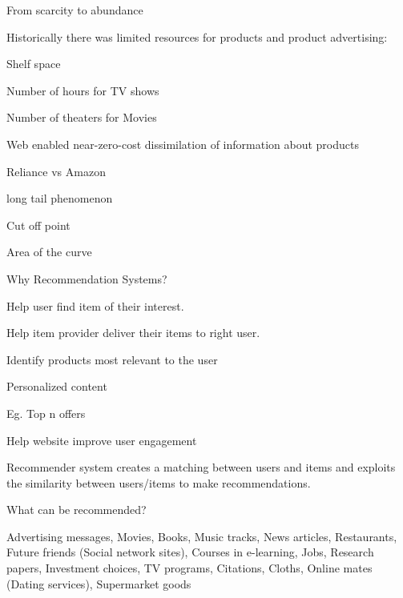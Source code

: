 \begin{bulletedlist}
		\item From scarcity to abundance
		\begin{bulletedlist}
			\item Historically there was limited resources for products and product advertising:
			\begin{bulletedlist}
				\item Shelf space
				\item Number of hours for TV shows
				\item Number of theaters for Movies
			\end{bulletedlist}
			\item Web enabled near-zero-cost dissimilation of information about products
			\begin{bulletedlist}
				\item Reliance vs Amazon
				\item long tail phenomenon
				\item Cut off point
				\item Area of the curve
			\end{bulletedlist}
		\end{bulletedlist}
		\item Why Recommendation Systems?
		\begin{bulletedlist}
			\item Help user find item of their interest.
			\item Help item provider deliver their items to right user.
			\begin{bulletedlist}
				\item Identify products most relevant to the user
				\item Personalized content
				\item Eg. Top n offers
			\end{bulletedlist}
			\item Help website improve user engagement
		\end{bulletedlist}
		\item Recommender system creates a matching between users and items and exploits the similarity between users/items to make recommendations.
		\item What can be recommended?
		\begin{bulletedlist}
			\item Advertising messages, Movies, Books, Music tracks, News articles, Restaurants, Future friends (Social network sites), Courses in e-learning, Jobs, Research papers, Investment choices, TV programs, Citations, Cloths, Online mates (Dating services), Supermarket goods

\end{bulletedlist}
\end{bulletedlist}
